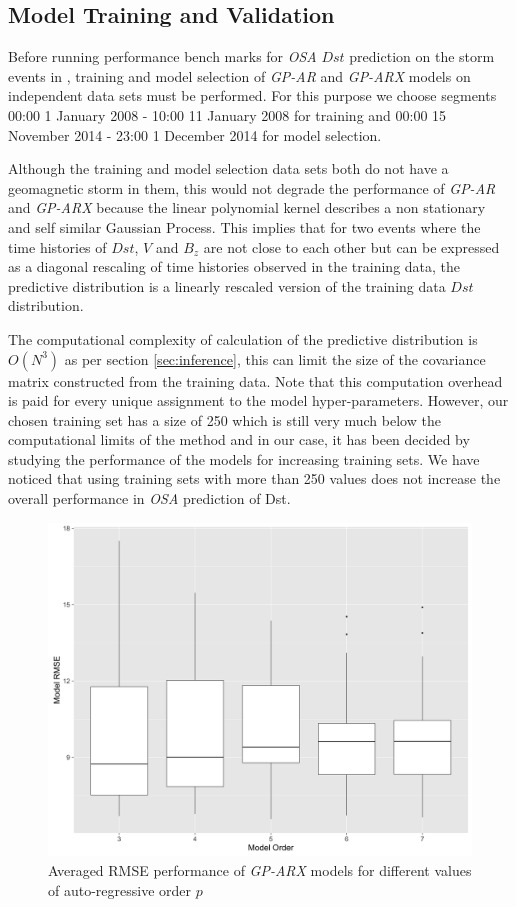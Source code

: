 \documentclass[referee,a4paper,12pt,traditabstract]{swsc}
\begin{document}
\begin{linenumbers}
\section{Model Training and Validation}

Before running performance bench marks for \emph{OSA} $Dst$ prediction on the storm events in \cite{Ji2012}, training and model selection of \emph{GP-AR} and \emph{GP-ARX} models on independent data sets must be performed. For this purpose we choose segments 00:00 1 January 2008 - 10:00 11 January 2008 for training and 00:00 15 November 2014 - 23:00 1 December 2014 for model selection. 

Although the training and model selection data sets both do not have a geomagnetic storm in them, this would not degrade the performance of \emph{GP-AR} and \emph{GP-ARX} because the linear polynomial kernel describes a non stationary and self similar Gaussian Process. This implies that for two events where the time histories of $Dst$, $V$ and $B_z$ are not close to each other but can be expressed as a diagonal rescaling of time histories observed in the training data, the predictive distribution is a linearly rescaled version of the training data $Dst$ distribution. 

The computational complexity of calculation of the predictive distribution is $O(N^3)$ as per section \ref{sec:inference}, this can limit the size of the covariance matrix constructed from the training data. Note that this computation overhead is paid for every unique assignment to the model hyper-parameters. However, our chosen training set has a size of 250 which is still very much below the computational limits of the method and in our case, it has been decided by studying the performance of the models for increasing training sets. We have noticed that using training sets with more than 250 values does not increase the overall performance in \emph{OSA} prediction of Dst.


\begin{figure}
   \centering
   \includegraphics[width=\textwidth]{Model_RMSE_validationStorms}
      \caption{Averaged RMSE performance of \emph{GP-ARX} models for different values of auto-regressive order $p$}
         \label{fig:prmse}
 \end{figure}



\end{linenumbers}
\end{document}

